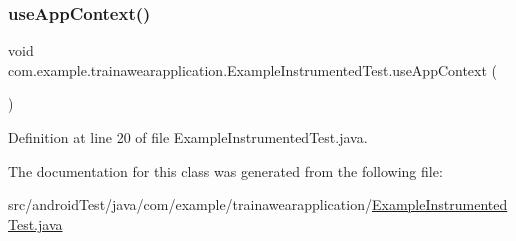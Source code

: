 \subsubsection{\texorpdfstring{useAppContext()}{useAppContext()}}
{\footnotesize\ttfamily void com.\+example.\+trainawearapplication.\+Example\+Instrumented\+Test.\+use\+App\+Context (\begin{DoxyParamCaption}{ }\end{DoxyParamCaption})}



Definition at line 20 of file Example\+Instrumented\+Test.\+java.


\begin{DoxyCode}{0}

\end{DoxyCode}


The documentation for this class was generated from the following file\+:\begin{DoxyCompactItemize}
\item 
src/android\+Test/java/com/example/trainawearapplication/\mbox{\hyperlink{_example_instrumented_test_8java}{Example\+Instrumented\+Test.\+java}}\end{DoxyCompactItemize}

